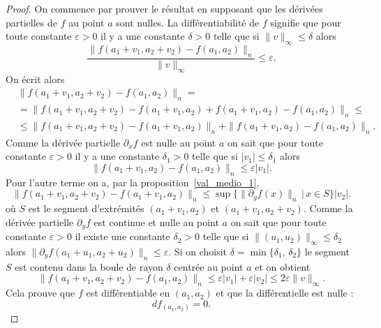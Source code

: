 \begin{proof}
	On commence par prouver le résultat en supposant que les dérivées partielles de \( f\) au point \( a\) sont nulles. La différentiabilité de \( f\) signifie que pour toute constante  \( \varepsilon> 0\) il y a une constante \( \delta>0\) telle que si \( \|v\|_\infty\leq \delta \) alors
	\[
		\frac{\|f(a_1+v_1, a_2+v_2)-f(a_1, a_2)\|_n}{\|v\|_\infty}\leq \varepsilon.
	\]
	On écrit alors
	\begin{equation}
		\begin{aligned}
			 & \|f(a_1+v_1, a_2+v_2)-f(a_1, a_2)\|_n=                                            \\
			 & =\|f(a_1+v_1, a_2+v_2)-f(a_1+v_1, a_2)+f(a_1+v_1, a_2)-f(a_1, a_2)\|_n\leq        \\
			 & \leq \|f(a_1+v_1, a_2+v_2)-f(a_1+v_1, a_2)\|_n+\|f(a_1+v_1, a_2)-f(a_1, a_2)\|_n.
		\end{aligned}
	\end{equation}
	Comme la dérivée partielle \( \partial_x f\) est nulle au point \( a\)  on sait que  pour toute constante  \( \varepsilon> 0\) il y a une constante \( \delta_1>0\) telle que si \( |v_1|\leq \delta_1 \) alors
	\[
		\|f(a_1+v_1, a_2)-f(a_1, a_2)\|_n\leq \varepsilon |v_1|.
	\]
	Pour l'autre terme on a, par la proposition~\ref{val_medio_1},
	\begin{equation}
		\|f(a_1+v_1, a_2+v_2)-f(a_1+v_1, a_2)\|_n\leq \sup\{\|\partial_yf(x)\|_n\,\vert\, x\in S\}|v_2|.
	\end{equation}
	où \( S\) est le segment d'extrémités  \( (a_1+v_1, a_2)\) et \(  (a_1+v_1, a_2+v_2)\). Comme la  dérivée partielle \( \partial_y f\) est continue et nulle au point \( a\) on sait que  pour toute constante  \( \varepsilon> 0\) il existe une constante \( \delta_2>0\) telle que si \( \|(u_1,u_2)\|_\infty\leq \delta_2 \) alors \( \|\partial_yf(a_1+u_1,a_2+u_2)\|_n\leq \varepsilon\). Si on choisit \( \delta = \min\{\delta_1,\,\delta_2\}\) le segment \( S\) est contenu dans la boule de rayon \( \delta\) centrée au point \( a\) et on obtient
	\[
		\|f(a_1+v_1, a_2+v_2)-f(a_1, a_2)\|_n\leq \varepsilon |v_1|+\varepsilon |v_2|\leq 2\varepsilon \|v\|_\infty.
	\]
	Cela prouve que \( f\) est différentiable en \( (a_1,a_2)\) et que la différentielle est nulle :
	\begin{equation}
		df_{(a_1,a_2)}=0.
	\end{equation}


\end{proof}
